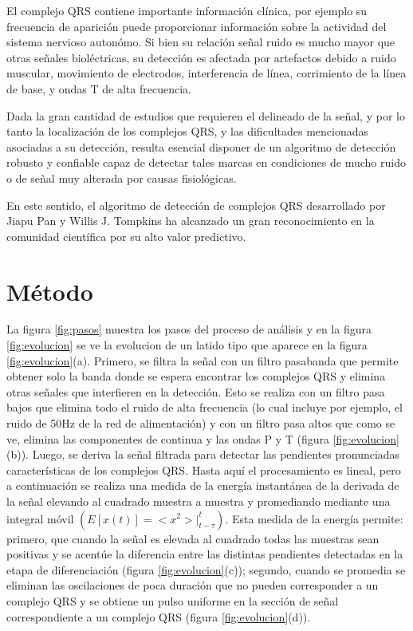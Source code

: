 \documentclass[%
        final,
        notitlepage,
        narroweqnarray,
        inline,
        ]{ieee}
\numberwithin{equation}{section}
\numberwithin{figure}{section}
\numberwithin{table}{section}
\begin{document}
\PARstart El complejo QRS contiene importante información clínica, por ejemplo su frecuencia de aparición puede proporcionar información sobre la actividad del sistema nervioso autonómo. Si bien su relación señal ruido es mucho mayor que otras señales bioléctricas, su detección es afectada por artefactos debido a ruido muscular, movimiento de electrodos, interferencia de línea, corrimiento de la línea de base, y ondas T de alta frecuencia.

	Dada la gran cantidad de estudios que requieren el delineado de la señal, y por lo tanto la localización de los complejos QRS, y las dificultades mencionadas asociadas a su detección, resulta esencial disponer de un algoritmo de detección robusto y confiable capaz de detectar tales marcas en condiciones de mucho ruido o de señal muy alterada por causas fisiológicas.

	En este sentido, el algoritmo de detección de complejos QRS desarrollado por Jiapu Pan y Willis J. Tompkins ha alcanzado un gran reconocimiento en la comunidad científica por su alto valor predictivo.
	
\section{Método}

La figura \ref{fig:pasos} muestra los pasos del proceso de análisis y en la figura \ref{fig:evolucion} 
se ve la evolucion de un latido tipo que aparece en la figura \ref{fig:evolucion}(a). 
Primero, se filtra la señal con un
filtro pasabanda que permite obtener solo la banda donde se espera encontrar los complejos
QRS y elimina otras señales que interfieren en la detección. Esto se realiza con un filtro pasa
bajos que elimina todo el ruido de alta frecuencia (lo cual incluye por ejemplo, el
ruido de 50Hz de la red de alimentación) y con un filtro pasa altos que como se
ve, elimina las componentes de continua y las ondas P y T (figura \ref{fig:evolucion}(b)). Luego, se deriva la señal filtrada
para detectar las pendientes pronunciadas características de los complejos QRS.
Hasta aquí el procesamiento es lineal, pero a continuación se realiza una medida de la
energía instantánea de la derivada de la señal elevando al cuadrado muestra a muestra
y promediando mediante una integral móvil $(E[x(t)] =< x^2 > |^t_{t-\tau})$. Esta medida de la
energía permite: primero, que cuando la señal es elevada al cuadrado todas las muestras sean
positivas y se acentúe la diferencia entre las distintas pendientes detectadas en la etapa de
diferenciación (figura \ref{fig:evolucion}(c)); segundo, cuando se promedia se eliminan las oscilaciones de poca
duración que no pueden corresponder a un complejo QRS y se obtiene un pulso uniforme
en la sección de señal correspondiente a un complejo QRS (figura \ref{fig:evolucion}(d)).
\end{document}
